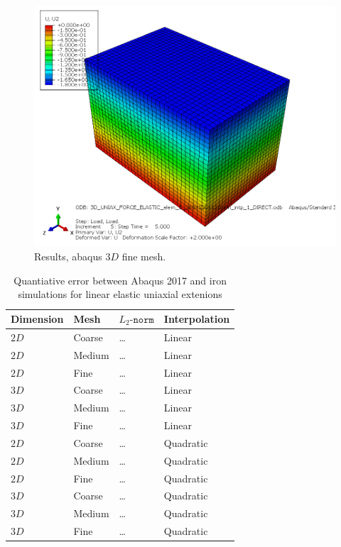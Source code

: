 \begin{figure}[h!]
    \centering 
    \includegraphics[width=\columnwidth]{examples/example-0111/doc/figures/3D_UNIAX_FORCE_ELASTIC_elem_5_160x120x120mm_intp_1_DIRECTU2.png} 
    \caption{Results, abaqus $3D$ fine mesh.}
    \label{example-0101-abaqus-3D-fig}
\end{figure}
%
\begin{table}[h!]
	\centering
    \begin{tabular}{llll}
    Dimension & Mesh 		& $L_2\texttt{-norm}$			& Interpolation \\ \hline
    $2D$      & Coarse 	& \ldots									& Linear \\
    $2D$      & Medium  & \ldots									& Linear \\
    $2D$      & Fine  	& \ldots									& Linear \\
    $3D$      & Coarse  & \ldots									& Linear \\
    $3D$      & Medium  & \ldots									& Linear \\
		$3D$			&	Fine 		&	\ldots									& Linear \\
    $2D$      & Coarse 	& \ldots									& Quadratic \\
    $2D$      & Medium  & \ldots									& Quadratic \\
    $2D$      & Fine  	& \ldots									& Quadratic \\
    $3D$      & Coarse  & \ldots									& Quadratic \\
    $3D$      & Medium  & \ldots									& Quadratic \\
		$3D$			&	Fine 		&	\ldots									& Quadratic \\		
    \end{tabular}
		\caption{Quantiative error between Abaqus 2017 and iron simulations for linear elastic uniaxial extenions}
		\label{tab:example-0101-valid-Iron-Abaqus}
\end{table}
